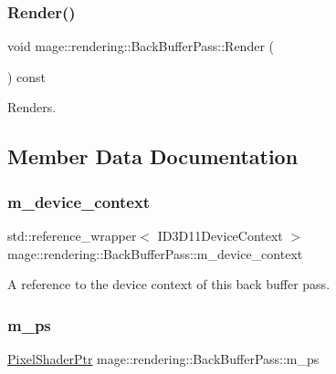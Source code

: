 \subsubsection{\texorpdfstring{Render()}{Render()}}
{\footnotesize\ttfamily void mage\+::rendering\+::\+Back\+Buffer\+Pass\+::\+Render (\begin{DoxyParamCaption}{ }\end{DoxyParamCaption}) const\hspace{0.3cm}{\ttfamily [noexcept]}}

Renders. 

\subsection{Member Data Documentation}
\hypertarget{classmage_1_1rendering_1_1_back_buffer_pass_ae87c0cf8b2ffe627ac44faaf61791b4f}{}\label{classmage_1_1rendering_1_1_back_buffer_pass_ae87c0cf8b2ffe627ac44faaf61791b4f} 
\subsubsection{\texorpdfstring{m\+\_\+device\+\_\+context}{m\_device\_context}}
{\footnotesize\ttfamily std\+::reference\+\_\+wrapper$<$ I\+D3\+D11\+Device\+Context $>$ mage\+::rendering\+::\+Back\+Buffer\+Pass\+::m\+\_\+device\+\_\+context\hspace{0.3cm}{\ttfamily [private]}}

A reference to the device context of this back buffer pass. \hypertarget{classmage_1_1rendering_1_1_back_buffer_pass_a46bc7e8b3636db2eb84b42590b7bd51e}{}\label{classmage_1_1rendering_1_1_back_buffer_pass_a46bc7e8b3636db2eb84b42590b7bd51e} 
\subsubsection{\texorpdfstring{m\+\_\+ps}{m\_ps}}
{\footnotesize\ttfamily \hyperlink{namespacemage_1_1rendering_af03d922b228ee9c8542baaa2ecc9f259}{Pixel\+Shader\+Ptr} mage\+::rendering\+::\+Back\+Buffer\+Pass\+::m\+\_\+ps\hspace{0.3cm}{\ttfamily [private]}}


